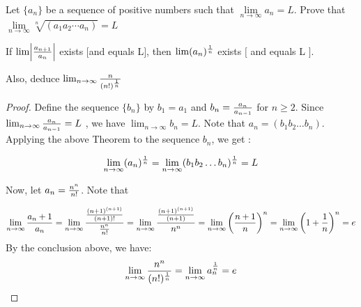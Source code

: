 \documentclass{notes}
\begin{document}
\paragraph{}
\begin{theorem}{}
	Let $\{a_n\}$ be a sequence of positive numbers such that $\lim\limits_{n \to \infty} a_n = L$. Prove that $\lim\limits_{n \to \infty} \sqrt[n]{(a_1a_2\cdots a_n)}= L$
\end{theorem}
	
	

\begin{theorem}{}
	If $\lim \abs{{a_{n+1} \over a_n}}$ exists $[$and equals L$]$, then $\lim (a_n)^ {1 \over n}$ exists $[$ and
	equals L $] $.
	
	Also, deduce $\lim_{n \to \infty} {n \over (n!)^{1 \over n}}$
\end{theorem}
\begin{proof}
	Define the sequence $\{b_n\}$ by $b_1 = a_1$ and $b_n ={a_n \over a_{n-1}}$
	for $n\geq 2$. Since $ \lim_{n \to \infty}{a_n \over a_{n-1}} = L$ ,
	we have $\lim_{n\to \infty} b_n = L$. Note that $a_n = (b_1b_2\ldots b_n)$. Applying the above Theorem to the sequence ${b_n}$,
	we get
	:
	
	$$ \lim_{n \to \infty } (a_n)^ {1 \over n} = \lim\limits_{n \to \infty}(b_1b_2\ldots b_n)^{1 \over n} = L $$
	
	Now, let $a_n = {n^n \over n!} $. Note that
	
	$$ \lim_{n \to \infty } {a_n+1 \over a_n} = \lim_{n \to \infty } \frac{{(n+1)^ {(n+1)} \over (n+1)!} }{{n^n \over n!}} =  \lim_{n \to \infty } \frac{{(n+1)^ {(n+1)} \over (n+1)} }{n^n} =  \lim_{n \to \infty } \left( n+1 \over n\right)^n =  \lim_{n \to \infty } \left(1+{1\over n}\right)^n = e$$
	By the conclusion above, we have:
	$$ \lim_{n \to \infty }{n^n \over (n!)^{1 \over n}} = \lim_{n \to \infty } a_n ^ {1 \over n} =e$$
\end{proof}
\end{document}
